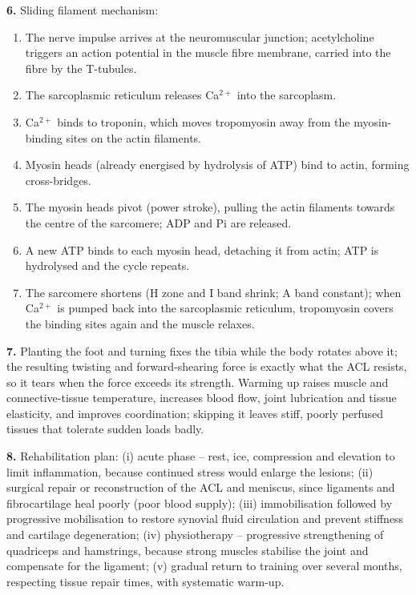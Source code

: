 \documentclass[11pt]{article}
\newcommand{\cle}[1]{{\popxbold\color{popdark}#1}}
\begin{document}
\textbf{6.} Sliding filament mechanism:
\begin{enumerate}
\item The nerve impulse arrives at the neuromuscular junction; acetylcholine triggers an action potential in the muscle fibre membrane, carried into the fibre by the T-tubules.
\item The sarcoplasmic reticulum releases Ca$^{2+}$ into the sarcoplasm.
\item Ca$^{2+}$ binds to \cle{troponin}, which moves \cle{tropomyosin} away from the myosin-binding sites on the \cle{actin} filaments.
\item Myosin heads (already energised by hydrolysis of ATP) bind to actin, forming cross-bridges.
\item The myosin heads pivot (power stroke), pulling the actin filaments towards the centre of the sarcomere; ADP and Pi are released.
\item A new ATP binds to each myosin head, detaching it from actin; ATP is hydrolysed and the cycle repeats.
\item The sarcomere shortens (H zone and I band shrink; A band constant); when Ca$^{2+}$ is pumped back into the sarcoplasmic reticulum, tropomyosin covers the binding sites again and the muscle relaxes.
\end{enumerate}

\textbf{7.} Planting the foot and turning fixes the tibia while the body rotates above it; the resulting twisting and forward-shearing force is exactly what the ACL resists, so it tears when the force exceeds its strength. Warming up raises muscle and connective-tissue temperature, increases blood flow, joint lubrication and tissue elasticity, and improves coordination; skipping it leaves stiff, poorly perfused tissues that tolerate sudden loads badly.

\textbf{8.} Rehabilitation plan: (i) acute phase -- rest, ice, compression and elevation to limit inflammation, because continued stress would enlarge the lesions; (ii) surgical repair or reconstruction of the ACL and meniscus, since ligaments and fibrocartilage heal poorly (poor blood supply); (iii) immobilisation followed by progressive mobilisation to restore synovial fluid circulation and prevent stiffness and cartilage degeneration; (iv) physiotherapy -- progressive strengthening of quadriceps and hamstrings, because strong muscles stabilise the joint and compensate for the ligament; (v) gradual return to training over several months, respecting tissue repair times, with systematic warm-up.
\end{document}
